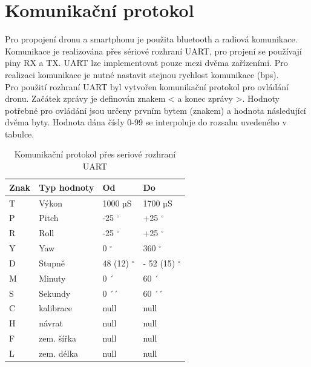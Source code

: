 \section{Komunikační protokol}
Pro propojení dronu a smartphonu je použita bluetooth a radiová komunikace. Komunikace je realizována přes sériové rozhraní UART, pro projení se používají piny RX a TX. UART lze implementovat pouze mezi dvěma zařízeními. Pro realizaci komunikace je nutné nastavit stejnou rychlost komunikace (bps).\\
Pro použití rozhraní UART byl vytvořen komunikační protokol pro ovládání dronu. Začátek zprávy je definován znakem < a konec zprávy >. Hodnoty potřebné pro ovládání jsou určeny prvním bytem (znakem) a hodnota následující dvěma byty. Hodnota dána čísly 0-99 se interpoluje do rozsahu uvedeného v tabulce.\\

\begin{table}[H]
	\centering
	\begin{tabular}{|l|l|l|l|}
		\hline
		\textbf{Znak} & \textbf{Typ hodnoty} & \textbf{Od} & \textbf{Do} \\ \hline
		T             & Výkon                & 1000 µS     & 1700 µS     \\ \hline
		P             & Pitch                & -25 $^\circ$        & +25 $^\circ$        \\ \hline
		R             & Roll                 & -25 $^\circ$        & +25 $^\circ$        \\ \hline
		Y             & Yaw                  & 0 $^\circ$          & 360 $^\circ$        \\ \hline
		D             & Stupně               & 48 (12) $^\circ$    & - 52 (15) $^\circ$  \\ \hline
		M             & Minuty               & 0 ´           & 60 ´         \\ \hline
		S             & Sekundy              & 0 ´´          & 60 ´´         \\ \hline
		C             & kalibrace            & null        & null        \\ \hline
		H             & návrat               & null        & null        \\ \hline
		F             & zem. šířka           & null        & null        \\ \hline
		L             & zem. délka           & null        & null        \\ \hline
	\end{tabular}
\caption{Komunikační protokol přes seriové rozhraní UART}
\end{table}

